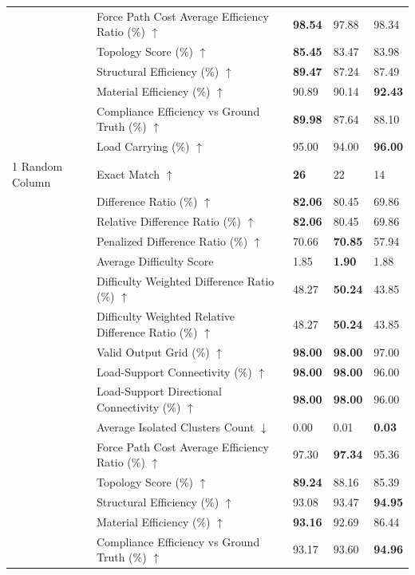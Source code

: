 \begin{table}[!h]
{\begin{tabular}{lllll}
 & Force Path Cost Average Efficiency Ratio (\%) $\uparrow$ & \textbf{98.54} & 97.88 & 98.34 \\
 & Topology Score (\%) $\uparrow$ & \textbf{85.45} & 83.47 & 83.98 \\
 & Structural Efficiency (\%) $\uparrow$ & \textbf{89.47} & 87.24 & 87.49 \\
 & Material Efficiency (\%) $\uparrow$ & 90.89 & 90.14 & \textbf{92.43} \\
 & Compliance Efficiency vs Ground Truth (\%) $\uparrow$ & \textbf{89.98} & 87.64 & 88.10 \\
 & Load Carrying (\%) $\uparrow$ & 95.00 & 94.00 & \textbf{96.00} \\
1 Random Column & Exact Match $\uparrow$ & \textbf{26} & 22 & 14 \\
 & Difference Ratio (\%) $\uparrow$ & \textbf{82.06} & 80.45 & 69.86 \\
 & Relative Difference Ratio (\%) $\uparrow$ & \textbf{82.06} & 80.45 & 69.86 \\
 & Penalized Difference Ratio (\%) $\uparrow$ & 70.66 & \textbf{70.85} & 57.94 \\
 & Average Difficulty Score & 1.85 & \textbf{1.90} & 1.88 \\
 & Difficulty Weighted Difference Ratio (\%) $\uparrow$ & 48.27 & \textbf{50.24} & 43.85 \\
 & Difficulty Weighted Relative Difference Ratio (\%) $\uparrow$ & 48.27 & \textbf{50.24} & 43.85 \\
 & Valid Output Grid (\%) $\uparrow$ & \textbf{98.00} & \textbf{98.00} & 97.00 \\
 & Load-Support Connectivity (\%) $\uparrow$ & \textbf{98.00} & \textbf{98.00} & 96.00 \\
 & Load-Support Directional Connectivity (\%) $\uparrow$ & \textbf{98.00} & \textbf{98.00} & 96.00 \\
 & Average Isolated Clusters Count $\downarrow$ & 0.00 & 0.01 & \textbf{0.03} \\
 & Force Path Cost Average Efficiency Ratio (\%) $\uparrow$ & 97.30 & \textbf{97.34} & 95.36 \\
 & Topology Score (\%) $\uparrow$ & \textbf{89.24} & 88.16 & 85.39 \\
 & Structural Efficiency (\%) $\uparrow$ & 93.08 & 93.47 & \textbf{94.95} \\
 & Material Efficiency (\%) $\uparrow$ & \textbf{93.16} & 92.69 & 86.44 \\
 & Compliance Efficiency vs Ground Truth (\%) $\uparrow$ & 93.17 & 93.60 & \textbf{94.96} \\

\end{tabular}}
\end{table}
